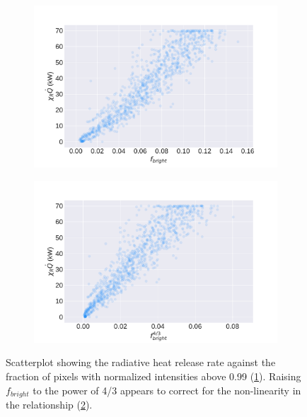\documentclass{article}
\begin{document}
\begin{figure}[htbp]
  \centering
  \begin{subfigure}[t]{.45\textwidth}
      \centering
      \includegraphics[width=\textwidth,keepaspectratio]{figures/frac_bright_scatterplot.pdf}
      \caption{}
      \label{fig:frac_bright}
  \end{subfigure}
  \begin{subfigure}[t]{.45\textwidth}
      \centering
      \includegraphics[width=\textwidth ,keepaspectratio]{figures/frac_bright_43_scatterplot.pdf}
      \caption{}
      \label{fig:frac_bright_43}
  \end{subfigure}
  \caption{Scatterplot showing the radiative heat release rate against the fraction of pixels with normalized intensities above 0.99 (\protect\ref{fig:frac_bright}). Raising $f_{bright}$ to the power of 4/3 appears to correct for the non-linearity in the relationship (\protect\ref{fig:frac_bright_43}).} 
  \label{fig:frac_bright_scatterplots}
\end{figure}
\end{document}

